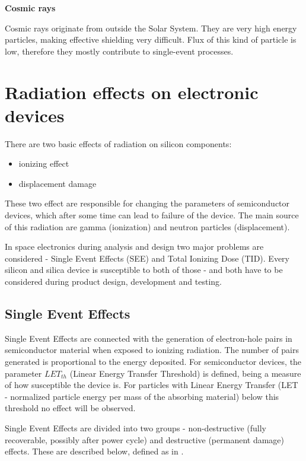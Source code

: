     \bigskip \textbf{Cosmic rays}

    Cosmic rays originate from outside the Solar System. They are very high energy particles, making effective shielding very difficult. Flux of this kind of particle is low, therefore they mostly contribute to single-event processes.

\section{Radiation effects on electronic devices}
    There are two basic effects of radiation on silicon components:
    \begin{itemize}
        \item ionizing effect
        \item displacement damage
    \end{itemize}

    These two effect are responsible for changing the parameters of semiconductor devices, which after some time can lead to failure of the device. The main source of this radiation are gamma (ionization) and neutron particles (displacement).

    In space electronics during analysis and design two major problems are considered - Single Event Effects (SEE) and Total Ionizing Dose (TID). Every silicon and silica device is susceptible to both of those - and both have to be considered during product design, development and testing.

    \subsection{Single Event Effects}
    \label{Single_Event_Effects}
        Single Event Effects are connected with the generation of electron-hole pairs in semiconductor material when exposed to ionizing radiation. The number of pairs generated is proportional to the energy deposited. For semiconductor devices, the parameter $LET_{th}$ (Linear Energy Transfer Threshold) is defined, being a measure of how susceptible the device is. For particles with Linear Energy Transfer (LET - normalized particle energy per mass of the absorbing material) below this threshold no effect will be observed.

        Single Event Effects are divided into two groups - non-destructive (fully recoverable, possibly after power cycle) and destructive (permanent damage) effects. These are described below, defined as in \cite{ECSS_Q_ST_60_15C}.

